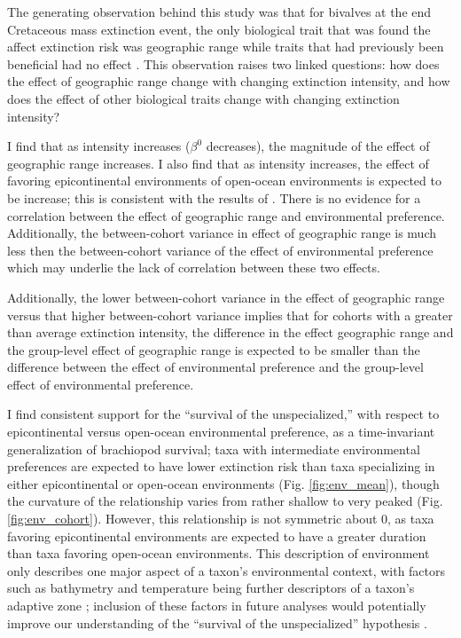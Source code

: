 \documentclass[11pt]{article}
\begin{document}


The generating observation behind this study was that for bivalves at the end Cretaceous mass extinction event, the only biological trait that was found the affect extinction risk was geographic range while traits that had previously been beneficial had no effect \citep{Jablonski1986}. This observation raises two linked questions: how does the effect of geographic range change with changing extinction intensity, and how does the effect of other biological traits change with changing extinction intensity?

I find that as intensity increases (\(\beta^{0}\) decreases), the magnitude of the effect of geographic range increases. I also find that as intensity increases, the effect of favoring epicontinental environments of open-ocean environments is expected to be increase; this is consistent with the results of \citet{Miller2009a}. There is no evidence for a correlation between the effect of geographic range and environmental preference. Additionally, the between-cohort variance in effect of geographic range is much less then the between-cohort variance of the effect of environmental preference which may underlie the lack of correlation between these two effects.

Additionally, the lower between-cohort variance in the effect of geographic range versus that higher between-cohort variance implies that for cohorts with a greater than average extinction intensity, the difference in the effect geographic range and the group-level effect of geographic range is expected to be smaller than the difference between the effect of environmental preference and the group-level effect of environmental preference.

I find consistent support for the ``survival of the unspecialized,'' with respect to epicontinental versus open-ocean environmental preference, as a time-invariant generalization of brachiopod survival; taxa with intermediate environmental preferences are expected to have lower extinction risk than taxa specializing in either epicontinental or open-ocean environments (Fig. \ref{fig:env_mean}), though the curvature of the relationship varies from rather shallow to very peaked (Fig. \ref{fig:env_cohort}). However, this relationship is not symmetric about 0, as taxa favoring epicontinental environments are expected to have a greater duration than taxa favoring open-ocean environments. This description of environment only describes one major aspect of a taxon's environmental context, with factors such as bathymetry and temperature being further descriptors of a taxon's adaptive zone \citep{Nurnberg2013a,Harnik2013,Harnik2011,Heim2011}; inclusion of these factors in future analyses would potentially improve our understanding of the ``survival of the unspecialized'' hypothesis \citep{Simpson1944}.
\end{document}
